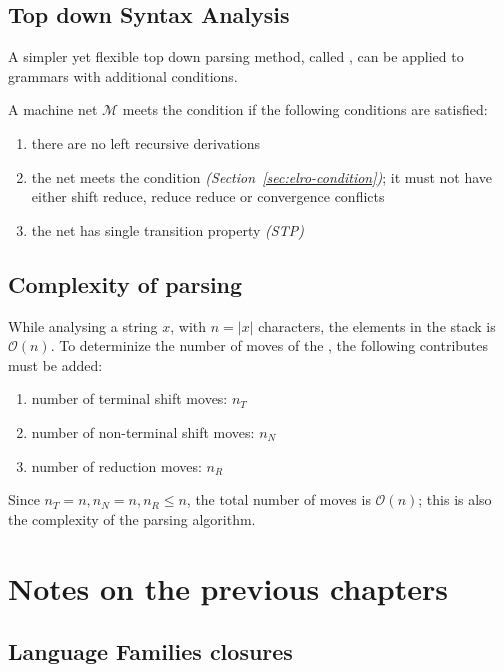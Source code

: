 \documentclass[english]{article}
\begin{document}
\subsection{Top down Syntax Analysis}
\label{sec:top-down}

A simpler yet flexible top down parsing method, called \ELLo, can be applied to \ELRo grammars with additional conditions.

A machine net \(\mathcal{M}\) meets the \ELLo condition if the following conditions are satisfied:

\begin{enumerate}
  \item there are no left recursive derivations
  \item the net meets the \ELRo condition \textit{(Section~\ref{sec:elro-condition})}; it must not have either shift reduce, reduce reduce or convergence conflicts
  \item the net has single transition property \textit{(STP)}
\end{enumerate}

\subsection{Complexity of parsing}

While analysing a string \(x\), with \(n = |x|\) characters, the elements in the stack is \(\mathcal{O}(n)\).
To determinize the number of moves of the \PDA, the following contributes must be added:

\begin{enumerate}
  \item number of terminal shift moves: \(n_T\)
  \item number of non-terminal shift moves: \(n_N\)
  \item number of reduction moves: \(n_R\)
\end{enumerate}

Since \(n_T = n, n_N = n, n_R \leq n\), the total number of moves is \(\mathcal{O}(n)\);
this is also the complexity of the parsing algorithm.

\clearpage

\section{Notes on the previous chapters}

\subsection{Language Families closures}
\end{document}
